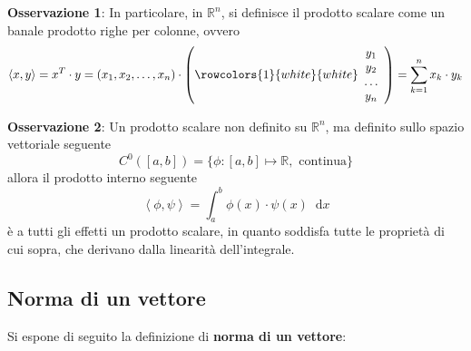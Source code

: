\documentclass[a4paper]{extarticle}
\newcommand*\dif{\mathop{}\!\mathrm{d}}
\begin{document}
\vspace{2em}
\noindent
\textbf{Osservazione 1}: In particolare, in $\mathbb{R}^n$, si definisce il prodotto scalare come un banale prodotto righe per colonne, ovvero
\[\left<x,y\right> = x{^T} \cdot y = \left(x_1,x_2,\dots,x_n\right) \cdot \left(
    \rowcolors{1}{white}{white}
    \begin{array}{c}
        y_1\\
        y_2\\
        \dots\\
        y_n
    \end{array}
\right) = \sum_{k=1}^n x_k \cdot y_k\]

\vspace{1em}
\noindent
\textbf{Osservazione 2}: Un prodotto scalare non definito su $\mathbb{R}^n$, ma definito sullo spazio vettoriale seguente
\[C^0 \left(\left[a,b\right]\right) = \{\phi : [a,b] \longmapsto \mathbb{R}, \text{ continua}\}\]
allora il prodotto interno seguente
\[\left<\phi,\psi\right> = \int_a^b \phi(x) \cdot \psi(x) \dif x\]
è a tutti gli effetti un prodotto scalare, in quanto soddisfa tutte le proprietà di cui sopra, che derivano dalla linearità dell'integrale.

\vspace{2em}
\subsection{Norma di un vettore}
Si espone di seguito la definizione di \textbf{norma di un vettore}:
\end{document}
